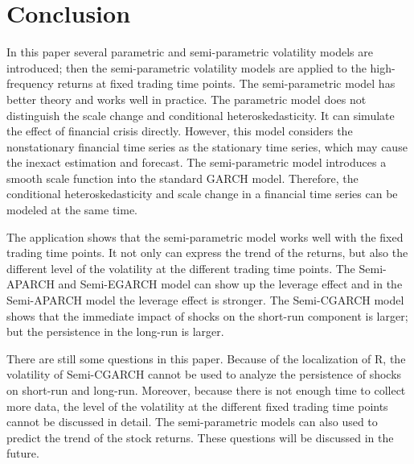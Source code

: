 \chapter{Conclusion}

In this paper several parametric and semi-parametric volatility models are introduced; then the semi-parametric volatility models are applied to the high-frequency returns at fixed trading time points. The semi-parametric model has better theory and works well in practice. The parametric model does not distinguish the scale change and conditional heteroskedasticity. It can simulate the effect of financial crisis directly. However, this model considers the nonstationary financial time series as the stationary time series, which may cause the inexact estimation and forecast. The semi-parametric model introduces a smooth scale function into the standard GARCH model. Therefore, the conditional heteroskedasticity and scale change in a financial time series can be modeled at the same time.

The application shows that the semi-parametric model works well with the fixed trading time points. It not only can express the trend of the returns, but also the different level of the volatility at the different trading time points. The Semi-APARCH and Semi-EGARCH model can show up the leverage effect and in the Semi-APARCH model the leverage effect is stronger. The Semi-CGARCH model shows that the immediate impact of shocks on the short-run component is larger; but the persistence in the long-run is larger.

There are still some questions in this paper. Because of the localization of R, the volatility of Semi-CGARCH cannot be used to analyze the persistence of shocks on short-run and long-run. Moreover, because there is not enough time to collect more data, the level of the volatility at the different fixed trading time points cannot be discussed in detail. The semi-parametric models can also used to predict the trend of the stock returns. These questions will be discussed in the future.
